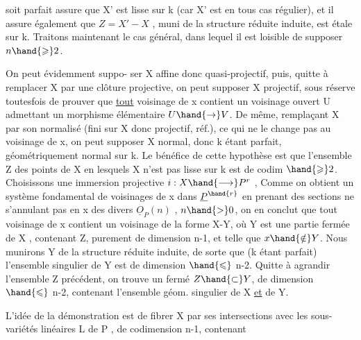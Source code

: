 
 soit parfait assure que X' est lisse sur k (car X' est en tous cas
régulier), et il assure également que $Z = X' - X$ , muni de la structure
réduite induite, est étale sur k. Traitons maintenant le cas général,
dans lequel il est loisible de supposer $n \hand{\geqslant} 2$.

 On peut évidemment suppo-%
ser X  affine donc quasi-projectif, puis, quitte à remplacer X
par une clôture projective, on peut supposer X projectif, sous réserve
toutesfois de prouver que \uline{tout} voisinage de x contient un voisinage
ouvert U admettant un morphisme élémentaire $U \hand{\to} V$. De même, remplaçant
X par son normalisé (fini sur X donc projectif, réf.), ce qui ne le
change pas au voisinage de x, on peut supposer X normal, donc k étant
parfait, géométriquement normal sur k.  Le
bénéfice de cette hypothèse est que l'ensemble Z des points de X en
lesquels X n'est pas lisse sur k est de codim $\hand{\geqslant} 2$. 
Choisissons une immersion projective $i : X \hand{\longrightarrow} P^r$ , 
 Comme on obtient un système
fondamental de voisinages de x dans $\underline{P}^{\hand{r}}$ en prenant des sections ne
s'annulant pas en x des divers $\underline{O}_P(n)$ , $n \hand{>} 0$, on en conclut que tout
voisinage de x contient un voisinage de la forme X-Y, où Y est une
partie fermée de X , contenant Z, purement de dimension n-1, et telle que
$x \hand{\notin} Y$. Nous munirons Y de la structure réduite induite, de sorte que
(k étant parfait) l'ensemble singulier de Y est de dimension $\hand{\leqslant}$ n-2. \margin{\unsure{$\nearrow$}}
Quitte à agrandir l'ensemble Z précédent, on trouve un fermé $Z \hand{\subset} Y$, de
dimension $\hand{\leqslant}$ n-2, contenant l'ensemble géom. singulier de X \uline{et} de Y.

L'idée de la démonstration est de fibrer X par ses intersections
avec les sous-variétés linéaires L de P , de codimension n-1, contenant

